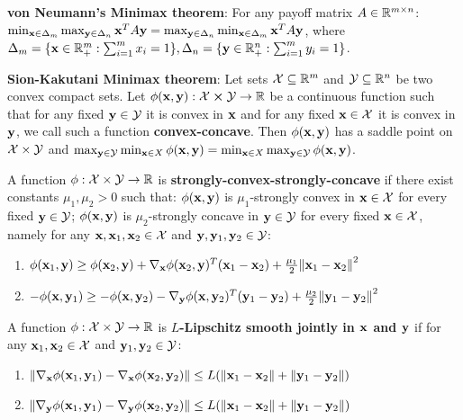 \begin{framed}
    \textbf{von Neumann’s Minimax theorem}: For any payoff matrix $A \in \mathbb{R}^{m \times n}$: $\min_{\mathbf{x} \in \Delta_m} \max_{\mathbf{y} \in \Delta_n} \mathbf{x}^T A \mathbf{y} = \max_{\mathbf{y} \in \Delta_n} \min_{\mathbf{x} \in \Delta_m} \mathbf{x}^T A \mathbf{y}$, where $\Delta_m = \{ \mathbf{x} \in \mathbb{R}_{+}^m : \sum_{i=1}^m{x_i} = 1\}, \Delta_n = \{ \mathbf{y} \in \mathbb{R}_{+}^n : \sum_{i=1}^m{y_i} = 1\}$.
\end{framed}
\begin{framed}
    \textbf{Sion-Kakutani Minimax theorem}: Let sets $\mathcal{X} \subseteq \mathbb{R}^m$ and $\mathcal{Y} \subseteq \mathbb{R}^n$ be two convex compact sets. Let $\phi(\mathbf{x}, \mathbf{y}) : \mathcal{X} \cross \mathcal{Y} \rightarrow \mathbb{R}$ be a continuous function such that for any fixed $\mathbf{y}  \in \mathcal{Y}$ it is convex in $\mathbf{x}$ and for any fixed $\mathbf{x} \in \mathcal{X}$ it is convex in $\mathbf{y}$, we call such a function \textbf{convex-concave}. Then $\phi(\mathbf{x}, \mathbf{y})$ has a saddle point on $\mathcal{X} \times \mathcal{Y}$ and $\max_{\mathbf{y} \in \mathcal{Y}}\min_{\mathbf{x} \in X}{\phi(\mathbf{x}, \mathbf{y})} = \min_{\mathbf{x} \in X}\max_{\mathbf{y} \in \mathcal{Y}}{\phi(\mathbf{x}, \mathbf{y})}$.
\end{framed}
A function $\phi : \mathcal{X} \times \mathcal{Y} \rightarrow \mathbb{R}$ is \textbf{strongly-convex-strongly-concave} if there exist constants $\mu_1, \mu_2 > 0$ such that: $\phi(\mathbf{x}, \mathbf{y})$ is $\mu_1$-strongly convex in $\mathbf{x} \in \mathcal{X}$ for every fixed $\mathbf{y} \in \mathcal{Y}$;  $\phi(\mathbf{x}, \mathbf{y})$ is $\mu_2$-strongly concave in $\mathbf{y} \in \mathcal{Y}$ for every fixed $\mathbf{x} \in \mathcal{X}$, namely for any $\mathbf{x}, \mathbf{x}_1, \mathbf{x}_2 \in \mathcal{X}$ and $\mathbf{y}, \mathbf{y}_1, \mathbf{y}_2 \in \mathcal{Y}$:
\begin{enumerate}[label=(\roman*), topsep=0pt,itemsep=0ex,partopsep=0ex,parsep=0ex] 
    \itemsep0em
    \item $\phi(\mathbf{x}_1, \mathbf{y}) \geq \phi(\mathbf{x}_2, \mathbf{y}) + \nabla_{\mathbf{x}} \phi(\mathbf{x}_2, \mathbf{y})^T(\mathbf{x}_1 - \mathbf{x}_2) + \frac{\mu_1}{2}\norm{\mathbf{x}_1 - \mathbf{x}_2}^2$
    \item $- \phi(\mathbf{x}, \mathbf{y}_1) \geq - \phi(\mathbf{x}, \mathbf{y}_2) - \nabla_{\mathbf{y}} \phi(\mathbf{x}, \mathbf{y}_2)^T(\mathbf{y}_1 - \mathbf{y}_2) + \frac{\mu_2}{2}\norm{\mathbf{y}_1 - \mathbf{y}_2}^2$
\end{enumerate}
A function $\phi : \mathcal{X} \times \mathcal{Y} \rightarrow \mathbb{R}$ is \textbf{$L$-Lipschitz smooth jointly in $\mathbf{x}$ and $\mathbf{y}$} if for any $\mathbf{x}_1, \mathbf{x}_2 \in \mathcal{X}$ and $\mathbf{y}_1, \mathbf{y}_2 \in \mathcal{Y}$:
\begin{enumerate}[label=(\roman*), topsep=0pt,itemsep=0ex,partopsep=0ex,parsep=0ex] 
    \itemsep0em
    \item $\norm{\nabla_{\mathbf{x}} \phi(\mathbf{x}_1, \mathbf{y}_1) - \nabla_{\mathbf{x}} \phi(\mathbf{x}_2, \mathbf{y}_2)} \leq L (\norm{\mathbf{x}_1 - \mathbf{x}_2} + \norm{\mathbf{y}_1 - \mathbf{y}_2} )$
    \item $\norm{\nabla_{\mathbf{y}} \phi(\mathbf{x}_1, \mathbf{y}_1) - \nabla_{\mathbf{y}} \phi(\mathbf{x}_2, \mathbf{y}_2)} \leq L (\norm{\mathbf{x}_1 - \mathbf{x}_2} + \norm{\mathbf{y}_1 - \mathbf{y}_2} )$
\end{enumerate}
